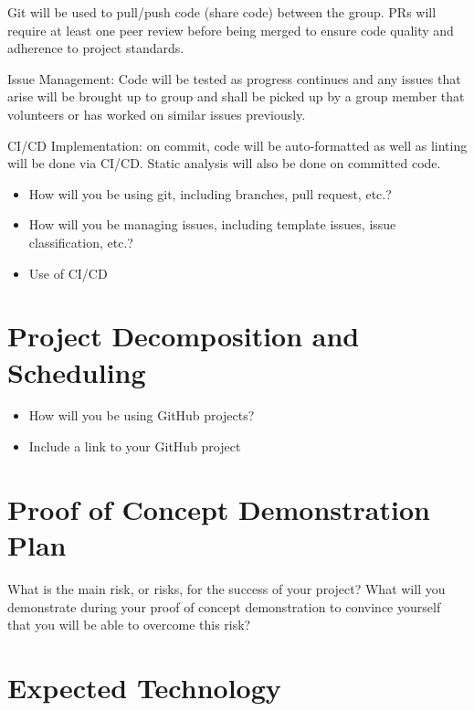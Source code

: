 \documentclass{article}
\begin{document}
Git will be used to pull/push code (share code) between the group. PRs will require at least one peer review before being merged to ensure code quality and adherence to project standards.

Issue Management:
Code will be tested as progress continues and any issues that arise will be brought up to group and shall be picked up by a group member that volunteers or has worked on similar issues previously.

CI/CD Implementation:
on commit, code will be auto-formatted as well as linting will be done via CI/CD. Static analysis will also be done on committed code.

\begin{itemize}
	\item How will you be using git, including branches, pull request, etc.?
	\item How will you be managing issues, including template issues, issue
	classification, etc.?
  \item Use of CI/CD
\end{itemize}

\section{Project Decomposition and Scheduling}

\begin{itemize}
  \item How will you be using GitHub projects?
  \item Include a link to your GitHub project
\end{itemize}


\section{Proof of Concept Demonstration Plan}

What is the main risk, or risks, for the success of your project?  What will you
demonstrate during your proof of concept demonstration to convince yourself that
you will be able to overcome this risk?

\section{Expected Technology}
\end{document}

